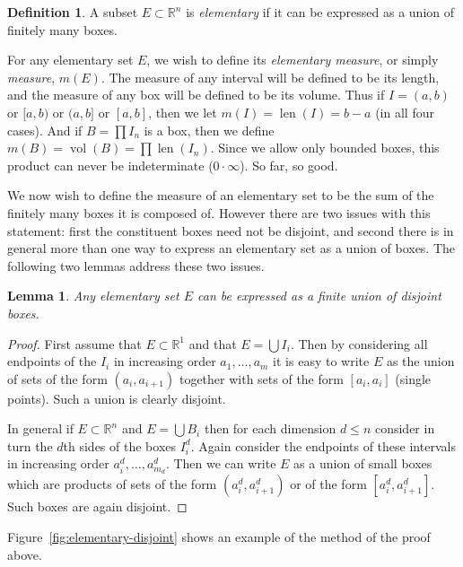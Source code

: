 \documentclass[11pt,oneside]{amsbook}
\newcommand{\RR}{{\mathbb R}}
\DeclareMathOperator{\len}{len}
\DeclareMathOperator{\vol}{vol}
\theoremstyle{definition}
\theoremstyle{plain}
\newtheorem{lem}[thm]{Lemma}
\theoremstyle{definition}
\newtheorem{defn}[thm]{Definition}
\theoremstyle{remark}
\numberwithin{equation}{section}
\numberwithin{figure}{section}
\begin{document}
\begin{defn}
  A subset $E\subset\RR^n$ is \emph{elementary} if it can be expressed as a union of finitely many boxes.
\end{defn}

For any elementary set $E$, we wish to define its \emph{elementary measure}, or simply \emph{measure}, $m(E)$. The measure of any interval will be defined to be its length, and the measure of any box will be defined to be its volume. Thus if $I=(a,b)$ or $[a,b)$ or $(a,b]$ or $[a,b]$, then we let $m(I)=\len(I)=b-a$ (in all four cases). And if $B=\prod I_n$ is a box, then we define $m(B)=\vol(B)=\prod\len(I_n)$. Since we allow only bounded boxes, this product can never be indeterminate ($0\cdot\infty$). So far, so good.

We now wish to define the measure of an elementary set to be the sum of the finitely many boxes it is composed of. However there are two issues with this statement: first the constituent boxes need not be disjoint, and second there is in general more than one way to express an elementary set as a union of boxes. The following two lemmas address these two issues.

\begin{lem}
  Any elementary set $E$ can be expressed as a finite union of disjoint boxes.
\end{lem}

\begin{proof}
  First assume that $E\subset\RR^1$ and that $E=\bigcup I_i$. Then by considering all endpoints of the $I_i$ in increasing order $a_1,\ldots,a_m$ it is easy to write $E$ as the union of sets of the form $(a_i,a_{i+1})$ together with sets of the form $[a_i,a_i]$ (single points). Such a union is clearly disjoint.

  In general if $E\subset\RR^n$ and $E=\bigcup B_i$ then for each dimension $d\leq n$ consider in turn the $d$th sides of the boxes $I_i^d$. Again consider the endpoints of these intervals in increasing order $a_i^d,\ldots,a_{m_d}^d$. Then we can write $E$ as a union of small boxes which are products of sets of the form $(a_i^d,a_{i+1}^d)$ or of the form $[a_i^d,a_{i+1}^d]$. Such boxes are again disjoint.
\end{proof}

Figure~\ref{fig:elementary-disjoint} shows an example of the method of the proof above.
\end{document}

